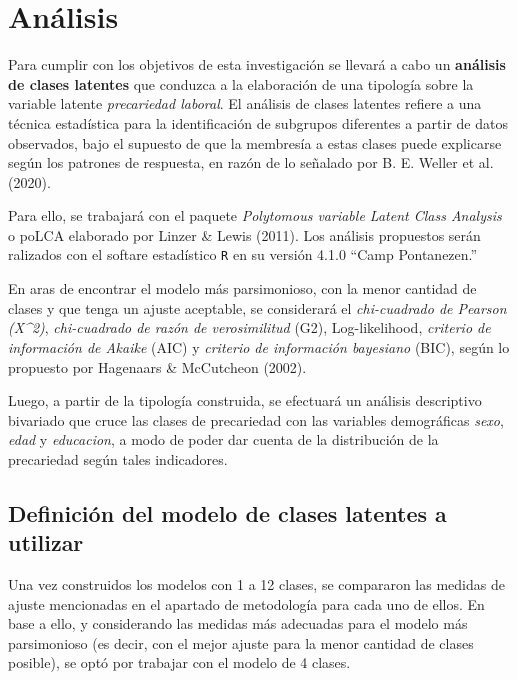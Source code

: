\documentclass[
]{article}
\begin{document}
\hypertarget{anuxe1lisis}{%
\section{Análisis}\label{anuxe1lisis}}

Para cumplir con los objetivos de esta investigación se llevará a cabo
un \textbf{análisis de clases latentes} que conduzca a la elaboración de
una tipología sobre la variable latente \emph{precariedad laboral}. El
análisis de clases latentes refiere a una técnica estadística para la
identificación de subgrupos diferentes a partir de datos observados,
bajo el supuesto de que la membresía a estas clases puede explicarse
según los patrones de respuesta, en razón de lo señalado por B. E.
Weller et al. (2020).

Para ello, se trabajará con el paquete \emph{Polytomous variable Latent
Class Analysis} o poLCA elaborado por Linzer \& Lewis (2011). Los
análisis propuestos serán ralizados con el softare estadístico
\texttt{R} en su versión 4.1.0 ``Camp Pontanezen.''

En aras de encontrar el modelo más parsimonioso, con la menor cantidad
de clases y que tenga un ajuste aceptable, se considerará el
\emph{chi-cuadrado de Pearson (X\^{}2)}, \emph{chi-cuadrado de razón de
verosimilitud} (G2), Log-likelihood, \emph{criterio de información de
Akaike} (AIC) y \emph{criterio de información bayesiano} (BIC), según lo
propuesto por Hagenaars \& McCutcheon (2002).

Luego, a partir de la tipología construida, se efectuará un análisis
descriptivo bivariado que cruce las clases de precariedad con las
variables demográficas \emph{sexo}, \emph{edad} y \emph{educacion}, a
modo de poder dar cuenta de la distribución de la precariedad según
tales indicadores.

\hypertarget{definiciuxf3n-del-modelo-de-clases-latentes-a-utilizar}{%
\subsection{Definición del modelo de clases latentes a
utilizar}\label{definiciuxf3n-del-modelo-de-clases-latentes-a-utilizar}}

Una vez construidos los modelos con 1 a 12 clases, se compararon las
medidas de ajuste mencionadas en el apartado de metodología para cada
uno de ellos. En base a ello, y considerando las medidas más adecuadas
para el modelo más parsimonioso (es decir, con el mejor ajuste para la
menor cantidad de clases posible), se optó por trabajar con el modelo de
4 clases.
\end{document}
